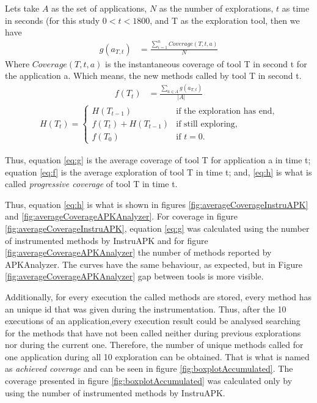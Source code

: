 Lets take $A$ as the set of applications, $N$ as the number of explorations, $t$ as time in seconds (for this study $0<t<1800$, and T as the exploration tool, then we have
\begin{align}
  g(a_{T,t}) &= \frac{\sum_{i=1}^{n} Coverage(T,t,a)}{N}\label{eq:g} 
\end{align}
Where $Coverage(T,t,a)$ is the instantaneous coverage of tool T in second t for the application a. Which means, the new methods called by tool T in second t.
\begin{align}
f(T_t) &= \frac{\sum_{a \in A} g(a_{T,t})}{|A|} \label{eq:f}
\end{align}
\begin{align}
H(T_t)=\begin{cases}
		H(T_{t-1})& \text{if the exploration has end},\\ 
		f(T_t)+H(T_{t-1})& \text{if still exploring},\\
		f(T_0)& \text{if $t = 0$}.\label{eq:h}
	\end{cases}
\end{align}

Thus, equation \ref{eq:g} is the average coverage of tool T for application a in time t; equation \ref{eq:f} is the average exploration of tool T in time t; and, \ref{eq:h} is what is called \textit{progressive coverage} of tool T in time t. 

Thus, equation \ref{eq:h} is what is shown in figures \ref{fig:averageCoverageInstruAPK} and \ref{fig:averageCoverageAPKAnalyzer}. For coverage in figure \ref{fig:averageCoverageInstruAPK}, equation \ref{eq:g} was calculated using the number of instrumented methods by InstruAPK and for figure \ref{fig:averageCoverageAPKAnalyzer} the number of methods reported by APKAnalyzer. The curves have the same behaviour, as expected, but in Figure \ref{fig:averageCoverageAPKAnalyzer} gap between tools is more visible.

Additionally, for every execution the called methods are stored, every method has an unique id that was given during the instrumentation. Thus, after the 10 executions of an application,every execution result could be analysed searching for the methods that have not been called neither during previous explorations nor during the current one. Therefore, the number of unique methods called for one application during all 10 exploration can be obtained. That is what is named as \textit{achieved coverage} and can be seen in figure \ref{fig:boxplotAccumulated}. The coverage presented in figure \ref{fig:boxplotAccumulated} was calculated only by using the number of instrumented methods by InstruAPK. 

